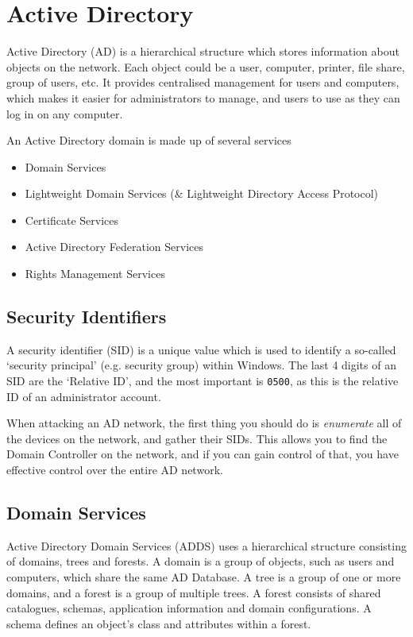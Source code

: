 
\section*{Active Directory}

Active Directory (AD) is a hierarchical structure which stores information about objects on the network. Each object
 could be a user, computer, printer, file share, group of users, etc. It provides centralised management for users and
 computers, which makes it easier for administrators to manage, and users to use as they can log in on any computer.

An Active Directory domain is made up of several services
\begin{itemize}
  \item Domain Services
  \item Lightweight Domain Services (\& Lightweight Directory Access Protocol)
  \item Certificate Services
  \item Active Directory Federation Services
  \item Rights Management Services
\end{itemize}

\subsection*{Security Identifiers}

A security identifier (SID) is a unique value which is used to identify a so-called `security principal' (e.g. security
 group) within Windows. The last 4 digits of an SID are the `Relative ID', and the most important is \verb`0500`, as
 this is the relative ID of an administrator account.

When attacking an AD network, the first thing you should do is \textit{enumerate} all of the devices on the network, and
 gather their SIDs. This allows you to find the Domain Controller on the network, and if you can gain control of that,
 you have effective control over the entire AD network.

\subsection*{Domain Services}

Active Directory Domain Services (ADDS) uses a hierarchical structure consisting of domains, trees and forests. A domain
 is a group of objects, such as users and computers, which share the same AD Database. A tree is a group of one or more
 domains, and a forest is a group of multiple trees. A forest consists of shared catalogues, schemas, application
 information and domain configurations. A schema defines an object's class and attributes within a forest.

